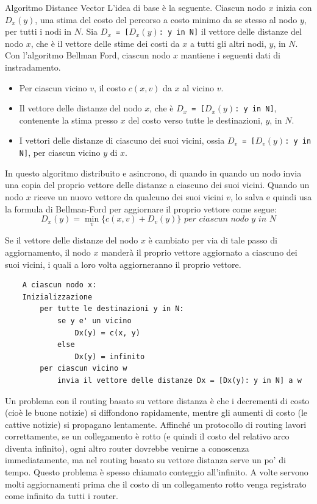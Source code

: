 \begin{Algoritmo}{Algoritmo Distance Vector}{}
    L'idea di base è la seguente. Ciascun nodo $x$ inizia con $D_x(y)$, una stima del costo del percorso a costo minimo da se stesso al nodo $y$, per tutti i nodi in $N$. Sia \texttt{$D_x$ = [$D_x(y)$: y in N]} il vettore delle distanze del nodo $x$, che è il vettore delle stime dei costi da $x$ a tutti gli altri nodi, $y$, in $N$. Con l'algoritmo Bellman Ford, ciascun nodo $x$ mantiene i seguenti dati di instradamento. 
    \begin{itemize}
        \item Per ciascun vicino $v$, il costo $c(x,v)$ da $x$ al vicino $v$.
        \item Il vettore delle distanze del nodo $x$, che è \texttt{$D_x$ = [$D_x(y)$: y in N]}, contenente la stima presso $x$ del costo verso tutte le destinazioni, $y$, in $N$. 
        \item I vettori delle distanze di ciascuno dei suoi vicini, ossia \texttt{$D_v$ = [$D_v(y)$: y in N]}, per ciascun vicino $y$ di $x$.
    \end{itemize}
    
    In questo algoritmo distribuito e asincrono, di quando in quando un nodo invia una copia del proprio vettore delle distanze a ciascuno dei suoi vicini. Quando un nodo $x$ riceve un nuovo vettore da qualcuno dei suoi vicini $v$, lo salva e quindi usa la formula di Bellman-Ford per aggiornare il proprio vettore come segue:
    \begin{equation*}
    D_x(y) = \min_v\{c(x,v) + D_v(y)\} \textit{ per ciascun nodo y in N}
    \end{equation*}
    
    Se il vettore delle distanze del nodo $x$ è cambiato per via di tale passo di aggiornamento, il nodo $x$ manderà il proprio vettore aggiornato a ciascuno dei suoi vicini, i quali a loro volta aggiorneranno il proprio vettore.

    \begin{lstlisting}
    A ciascun nodo x:
    Inizializzazione
        per tutte le destinazioni y in N:
            se y e' un vicino
                Dx(y) = c(x, y)
            else
                Dx(y) = infinito
        per ciascun vicino w
            invia il vettore delle distanze Dx = [Dx(y): y in N] a w
    \end{lstlisting}
\end{Algoritmo}

Un problema con il routing basato su vettore distanza è che i decrementi di costo (cioè le buone notizie) si diffondono rapidamente, mentre gli aumenti di costo (le cattive notizie) si propagano lentamente. Affinché un protocollo di routing lavori correttamente, se un collegamento è rotto (e quindi il costo del relativo arco diventa infinito), ogni altro router dovrebbe venirne a conoscenza immediatamente, ma nel routing basato su vettore distanza serve un po' di tempo. Questo problema è spesso chiamato conteggio all'infinito. A volte servono molti aggiornamenti prima che il costo di un collegamento rotto venga registrato come infinito da tutti i router.

